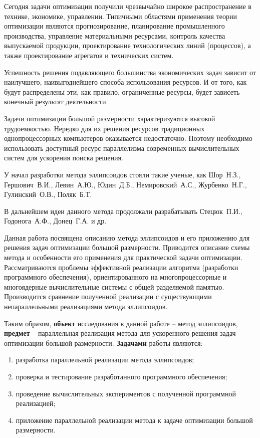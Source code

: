 
Сегодня задачи оптимизации получили чрезвычайно широкое распространение в технике, экономике, управлении. Типичными областями применения теории оптимизации являются прогнозирование, планирование промышленного производства, управление материальными ресурсами, контроль качества выпускаемой продукции, проектирование технологических линий (процессов), а также проектирование агрегатов и технических систем.

Успешность решения подавляющего большинства экономических задач зависит от наилучшего, наивыгоднейшего способа использования ресурсов. И от того, как будут распределены эти, как правило, ограниченные ресурсы, будет зависеть конечный результат деятельности.

Задачи оптимизации большой размерности характеризуются высокой трудоемкостью. Нередко для их решения ресурсов традиционных однопроцессорных компьютеров оказывается недостаточно. Поэтому необходимо использовать доступный ресурс параллелизма современных вычислительных систем для ускорения поиска решения.

У начал разработки метода эллипсоидов стояли такие ученые, как Шор~Н.З., Гершович~В.И., Левин~А.Ю., Юдин~Д.Б., Немировский~А.С., Журбенко~Н.Г., Гулинский~О.В., Поляк~Б.Т.

В дальнейшем идеи данного метода продолжали разрабатывать Стецюк~П.И., Годонога~А.Ф., Донец~Г.А. и др.

Данная работа посвящена описанию метода эллипсоидов и его приложению для решения задач оптимизации большой размерности. Приводится описание схемы метода и особенности его применения для практической задачи оптимизации. Рассматриваются проблемы эффективной реализации алгоритма (разработки программного обеспечения), ориентированного на многопроцессорные и многоядерные вычислительные системы с общей разделяемой памятью. Производится сравнение полученной реализации с существующими непараллельными реализациями метода эллипсоидов.

Таким образом, \textbf{объект} исследования в данной работе -- метод эллипсоидов, \textbf{предмет} -- параллельная реализация метода для ускоренного решения задач оптимизации большой размерности.
\textbf{Задачами} работы являются:

\begin{enumerate}
	\item разработка параллельной реализации метода эллипсоидов;
	\item проверка и тестирование разработанного программного обеспечения;
	\item проведение вычислительных экспериментов с полученной программной реализацией;
	\item приложение параллельной реализации метода к задаче оптимизации большой размерности.
\end{enumerate}

